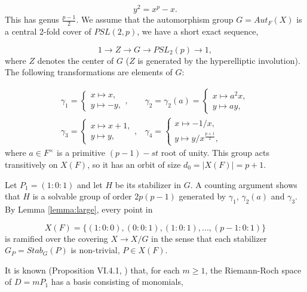 \documentclass[12pt]{article}
\numberwithin{equation}{section}
\begin{document}
\[
y^2=x^p-x.
\]
This has genus $\frac{p-1}{2}$. 
We assume that the automorphism group $G=Aut_F(X)$ is
a central 2-fold cover of $PSL(2,p)$,
we have a short exact 
sequence,

\begin{equation}
\label{eqn:*}
1\rightarrow Z \rightarrow G\rightarrow PSL_2(p)\rightarrow 1,
\end{equation}
where $Z$ denotes the center of $G$ 
($Z$ is generated by the hyperelliptic involution).
The following transformations are elements of
$G$:

\begin{equation}
\label{eqn:3.2}
\begin{array}{cc}
\gamma_1=
\left\{
\begin{array}{c}
x\longmapsto x,\\
y\longmapsto -y,
\end{array}
\right. ,
&
\gamma_2=\gamma_2(a)=
\left\{
\begin{array}{c}
x\longmapsto a^2x,\\
y\longmapsto ay,
\end{array}
\right.\\
\gamma_3=
\left\{
\begin{array}{c}
x\longmapsto x+1,\\
y\longmapsto y,
\end{array}
\right. ,
&
\gamma_4=
\left\{
\begin{array}{c}
x\longmapsto -1/x,\\
y\longmapsto y/x^{\frac{p+1}{2}},
\end{array}
\right. 
\end{array}
\end{equation}
where $a\in F^\times$ is a primitive $(p-1)-st$ root of unity.
This group acts transitively on $X(F)$,
so it has an orbit of size $d_0=|X(F)|=p+1$.

Let $P_1=(1:0:1)$ and let $H$ be its stabilizer in $G$.
A counting argument shows that $H$ is a solvable group of order 
$2p(p-1)$ generated by 
$\gamma_1$, $\gamma_2(a)$ and $\gamma_3$.
By Lemma \ref{lemma:large}, every point in 

\[
X(F)=\{(1:0:0),(0:0:1),(1:0:1),...,(p-1:0:1)  \}
\]
is ramified over the covering $X\rightarrow X/G$
in the sense that each stabilizer $G_P=Stab_G(P)$
is non-trivial, $P\in X(F)$. 

It is known (Proposition VI.4.1, \cite{Sti}) that, 
for each $m\geq 1$, the Riemann-Roch space
of $D=mP_1$ has a basis consisting of monomials,
\end{document}
